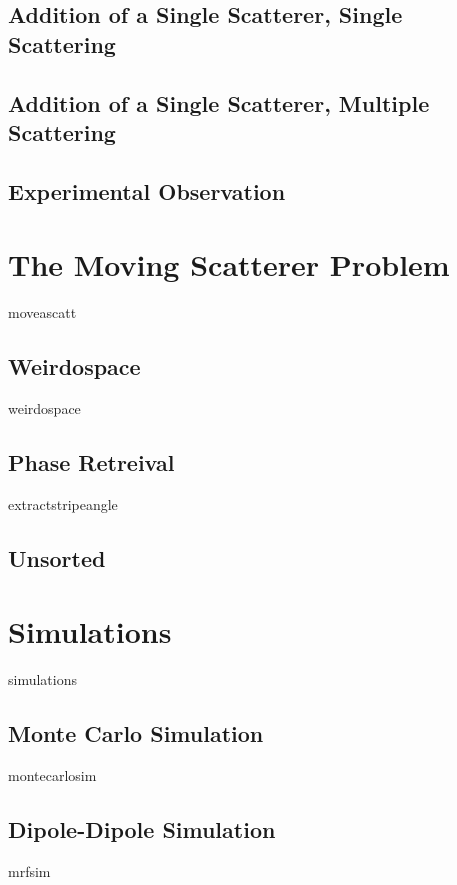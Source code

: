 \documentclass[a4paper,titlepage,onecolumn]{report}
\begin{document}
  \subsection{Addition of a Single Scatterer, Single Scattering}
  \subsection{Addition of a Single Scatterer, Multiple Scattering}
  \subsection{Experimental Observation}
 \section{The Moving Scatterer Problem}
        {moveascatt}
  \subsection{Weirdospace}
                {weirdospace}
                \subsection{Phase Retreival}
                {extractstripeangle}
  \subsection{Unsorted}
 \section{Simulations}
        {simulations}
        \subsection{Monte Carlo Simulation} \label{sec:montecarlo}
                {montecarlosim}
  \subsection{Dipole-Dipole Simulation} \label{sec:mrfsim}
                {mrfsim}
\end{document}
